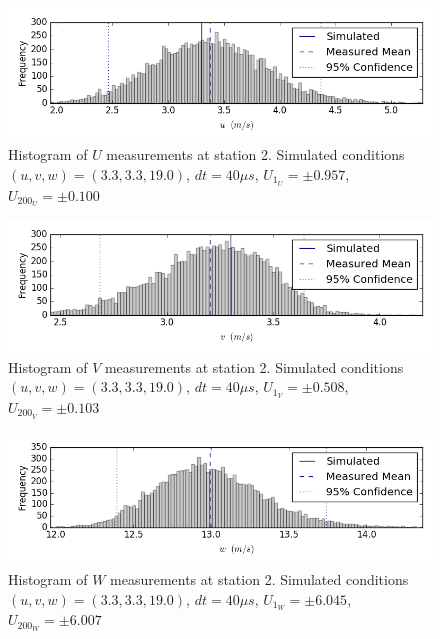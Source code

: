 \begin{figure}[H]
\centering
\includegraphics[width=6in]{figs/Ely_May28th02002/uncertainty_Ely_May28th02002_U}
\caption{Histogram of $U$ measurements at station 2. Simulated conditions $(u,v,w)=(3.3, 3.3, 19.0)$, $dt=40 \mu s$, $U_{1_{U}}=\pm 0.957$, $U_{200_{U}}=\pm 0.100$}
\label{fig:uncertainty_Ely_May28th02002_U}
\end{figure}


\begin{figure}[H]
\centering
\includegraphics[width=6in]{figs/Ely_May28th02002/uncertainty_Ely_May28th02002_V}
\caption{Histogram of $V$ measurements at station 2. Simulated conditions $(u,v,w)=(3.3, 3.3, 19.0)$, $dt=40 \mu s$, $U_{1_{V}}=\pm 0.508$, $U_{200_{V}}=\pm 0.103$}
\label{fig:uncertainty_Ely_May28th02002_V}
\end{figure}


\begin{figure}[H]
\centering
\includegraphics[width=6in]{figs/Ely_May28th02002/uncertainty_Ely_May28th02002_W}
\caption{Histogram of $W$ measurements at station 2. Simulated conditions $(u,v,w)=(3.3, 3.3, 19.0)$, $dt=40 \mu s$, $U_{1_{W}}=\pm 6.045$, $U_{200_{W}}=\pm 6.007$}
\label{fig:uncertainty_Ely_May28th02002_W}
\end{figure}


